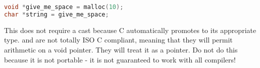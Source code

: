 \begin{lstlisting}[language=C]
void *give_me_space = malloc(10);
char *string = give_me_space;
\end{lstlisting}

This does not require a cast because C automatically promotes  to its appropriate type.
 and  are not totally ISO C compliant, meaning that they will permit arithmetic on a void pointer.
They will treat it as a  pointer.
Do not do this because it is not portable - it is not guaranteed to work with all compilers!

